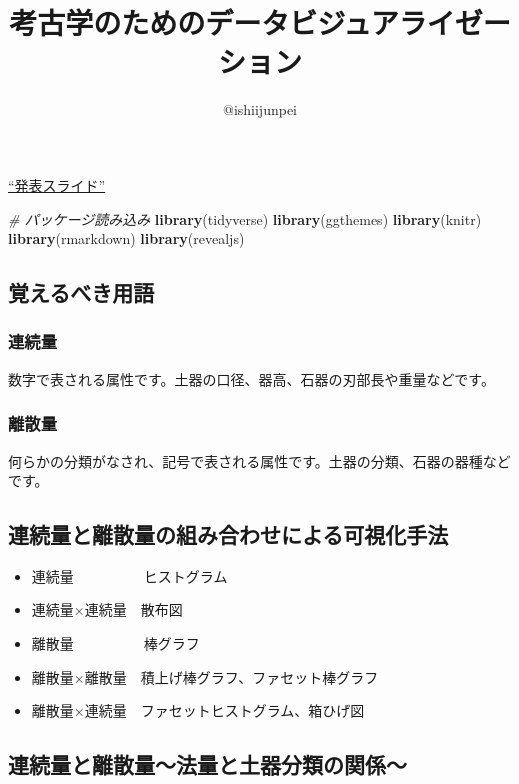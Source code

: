 \documentclass[]{article}
\title{考古学のためのデータビジュアライゼーション}
\author{@ishiijunpei}
\date{}
\newenvironment{Shaded}{\begin{snugshade}}{\end{snugshade}}
\newcommand{\CommentTok}[1]{\textcolor[rgb]{0.56,0.35,0.01}{\textit{#1}}}
\newcommand{\KeywordTok}[1]{\textcolor[rgb]{0.13,0.29,0.53}{\textbf{#1}}}
\newcommand{\NormalTok}[1]{#1}
\providecommand{\tightlist}{%
  \setlength{\itemsep}{0pt}\setlength{\parskip}{0pt}}
\begin{document}
\maketitle

\href{https://ishiijunpei.github.io/2019datasience/.}{``発表スライド''}

\begin{Shaded}
\begin{Highlighting}[]
\CommentTok{# パッケージ読み込み}
\KeywordTok{library}\NormalTok{(tidyverse)}
\KeywordTok{library}\NormalTok{(ggthemes)}
\KeywordTok{library}\NormalTok{(knitr)}
\KeywordTok{library}\NormalTok{(rmarkdown)}
\KeywordTok{library}\NormalTok{(revealjs)}
\end{Highlighting}
\end{Shaded}

\subsection{覚えるべき用語}

\subsubsection{連続量}

数字で表される属性です。土器の口径、器高、石器の刃部長や重量などです。

\subsubsection{離散量}

何らかの分類がなされ、記号で表される属性です。土器の分類、石器の器種などです。

\subsection{連続量と離散量の組み合わせによる可視化手法}

\begin{itemize}
\tightlist
\item
  連続量　　　　　ヒストグラム
\item
  連続量×連続量　散布図
\item
  離散量　　　　　棒グラフ
\item
  離散量×離散量　積上げ棒グラフ、ファセット棒グラフ
\item
  離散量×連続量　ファセットヒストグラム、箱ひげ図　
\end{itemize}

\subsection{連続量と離散量〜法量と土器分類の関係〜}
\end{document}
